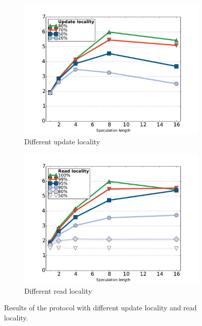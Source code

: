 \iffalse
\begin{figure}[t]
\centering
\begin{subfigure}[t!]{0.494\linewidth}
\def\svgwidth{0.95\columnwidth}
\hspace{-3mm}
\centering \includegraphics[scale = 0.21]{figures/updatelocality}
\caption{\footnotesize Different update locality}
\label{fig:remote:a}
\end{subfigure}
\begin{subfigure}[t!]{0.494\linewidth}
\vspace{1mm}
\def\svgwidth{0.95\columnwidth}
\centering \includegraphics[scale = 0.212]{figures/readlocality}%
\vspace{-1mm}
\caption{\footnotesize Different read locality}
\label{fig:remote:b}
\end{subfigure}
\caption{Results of the protocol with different update locality and read locality.}
\label{fig:micro_conflict}
\end{figure}


